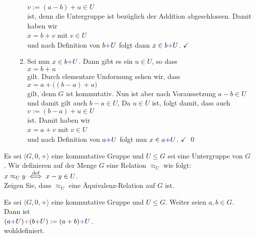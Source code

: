 \begin{enumerate}
\begin{enumerate}
        $v := (a - b) + u \in U$
        \\[0.2cm]
        ist, denn die Untergruppe ist bez\"{u}glich der Addition abgeschlossen.  Damit haben wir
        \\[0.2cm]
        \hspace*{1.3cm}
        $x = b + v$ mit $v \in U$
        \\[0.2cm]
        und nach Definition von $b {\color{blue}{+}} U$ folgt dann $x \in b {\color{blue}{+}} U$.
        {\color{green}$\checkmark$}
  \item Sei nun $x \in b {\color{blue}{+}} U$.  Dann gibt es ein $u \in U$, so dass
        \\[0.2cm]
        \hspace*{1.3cm}
        $x = b + u$
        \\[0.2cm]
        gilt.  Durch elementare Umformung sehen wir, dass
        \\[0.2cm]
        \hspace*{1.3cm}
        $x = a + \bigl((b - a) + u\bigr)$
        \\[0.2cm]
        gilt, denn $G$ ist kommutativ. Nun ist aber nach Voraussetzung $a-b \in U$ und damit gilt
        auch $b - a \in U$,  Da
        $u \in U$ ist, folgt damit, dass auch   
        \\[0.2cm]
        \hspace*{1.3cm}
        $v := (b - a) + u \in U$
        \\[0.2cm]
        ist.  Damit haben wir
        \\[0.2cm]
        \hspace*{1.3cm}
        $x = a + v$ mit $v \in U$
        \\[0.2cm]
        und nach Definition von $a {\color{blue}{+}} U$ folgt nun $x \in a {\color{blue}{+}} U$.  {\color{green}$\checkmark$}
        \qed
  \end{enumerate}
\end{enumerate}

\exercise
Es sei $\langle G, 0, + \rangle$ eine {\color{red}kommutative} Gruppe und $U \leq G$ sei eine
Untergruppe von $G$.   Wir definieren auf der Menge $G$ eine Relation $\approx_U$ wie folgt:
\\[0.2cm]
\hspace*{1.3cm}
$x \approx_U y \;\stackrel{\mbox{\scriptsize def}}{\Longleftrightarrow}\; x - y \in U$.
\\[0.2cm]
Zeigen Sie, dass $\approx_U$ eine \"{A}quivalenz-Relation auf $G$ ist.
\exend

\begin{Lemma}
  Es sei $\langle G, 0, + \rangle$ eine {\color{red}kommutative Gruppe} und $U \leq G$.
  Weiter seien $a,b \in G$.  Dann ist 
  \\[0.2cm]
  \hspace*{1.3cm}
  $(a {\color{blue}{+}} U) {\color{red}{+}} (b {\color{blue}{+}} U) := (a + b) {\color{blue}{+}} U$.
  \\[0.2cm]
  wohldefiniert.
\end{Lemma}

